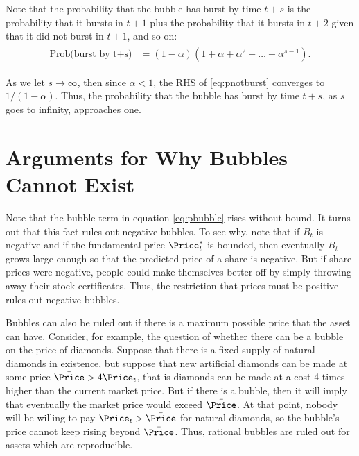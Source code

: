 \documentclass{handout}
\begin{document}
Note that the probability that the bubble has burst by time $t+s$ 
is the probability that it bursts in $t+1$ plus the probability that it bursts
in $t+2$ given that it did not burst in $t+1$, and so on:
\begin{equation}\begin{gathered}\begin{aligned}
        \text{Prob(burst by t+s)} & =  (1-\alpha)(1+\alpha+\alpha^{2}+\ldots+\alpha^{s-1}). \label{eq:pnotburst}
\end{aligned}\end{gathered}\end{equation}

As we let $s \rightarrow \infty$, then since $\alpha<1$, the RHS of 
\eqref{eq:pnotburst} converges to $1/(1-\alpha)$.  Thus, the 
probability that the bubble has burst by time $t+s$, as $s$ goes to 
infinity, approaches one.

\medskip

\hypertarget{WhyBubblesCannotExist}{}
\section{Arguments for Why Bubbles Cannot Exist}

\medskip

Note that the bubble term in equation \eqref{eq:pbubble} rises without 
bound.  It turns out that this fact rules out negative bubbles.  To 
see why, note that if $B_{t}$ is negative and if the fundamental price 
$\Price_{t}^{*}$ is bounded, then eventually $B_{t}$ grows large enough so that 
the predicted price of a share is negative.  But if share prices were 
negative, people could make themselves better off by simply throwing 
away their stock certificates.  Thus, the restriction that prices must 
be positive rules out negative bubbles.

Bubbles can also be ruled out if there is a maximum possible price 
that the asset can have.  Consider, for example, the question of 
whether there can be a bubble on the price of diamonds.  Suppose that 
there is a fixed supply of natural diamonds in existence, but suppose 
that new artificial diamonds can be made at some price $\bar{\Price}>4 
\Price_{t}$, that is diamonds can be made at a cost 4 times higher than the 
current market price.  But if there is a bubble, then it will imply 
that eventually the market price would exceed $\bar{\Price}$.  At that point, nobody will be willing to pay $\Price_{t}>\bar{\Price}$ 
for natural diamonds, so the bubble's price cannot keep rising beyond 
$\bar{\Price}$.  Thus, rational bubbles are ruled out for assets which are 
reproducible.
\end{document}

